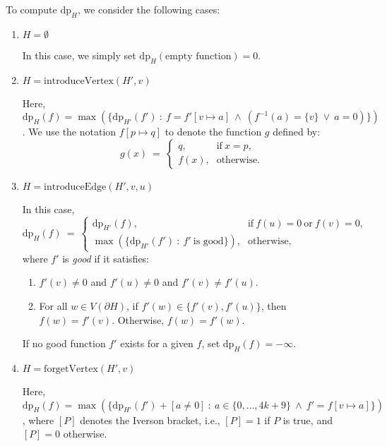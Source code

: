 \documentclass[12pt]{article}
\begin{document}
	To compute \(\text{dp}_{H}\), we consider the following cases:
	\begin{enumerate}
		\item \(H = \emptyset\)
		      
		      In this case, we simply set \(\text{dp}_{H}(\text{empty function})
		      = 0\).
		
		\item \(H = \text{introduceVertex}(H', v)\)
		      
		      Here, \(\text{dp}_{H}(f) = \max(\{\text{dp}_{H'}(f') \ : \ f =
		      f'[v \mapsto a] \ \wedge \ (f^{-1}(a) = \{v\} \ \vee \ a =
		      0)\})\). We use the notation \(f[p \mapsto q]\) to denote the
		      function \(g\) defined by:
		      \[ g(x) \ = \ \begin{cases} q \text{,} & \text{if} \ x = p
		      \text{,} \\
		      f(x) \text{,} & \text{otherwise.} \end{cases} \]
		
		\item \(H = \text{introduceEdge}(H', v, u)\)
		      
		      In this case,
		      \[ \text{dp}_{H}(f) \ = \ \begin{cases} \text{dp}_{H'}(f) \text{,}
		      & \text{if} \ f(u) = 0 \ \text{or} \ f(v) = 0 \text{,} \\
		      \max(\{\text{dp}_{H'}(f') \ : \ f' \ \text{is good}\}) \text{,} &
		      \text{otherwise,} \end{cases} \]
		      where \(f'\) is \textit{good} if it satisfies:
		      \begin{enumerate}[label=\theenumi.\arabic*]
		          \item \(f'(v) \neq 0\) and \(f'(u) \neq 0\) and \(f'(v) \neq
		                f'(u)\).
		          \item For all \(w \in V(\partial H)\), if \(f'(w) \in \{f'(v),
		                f'(u)\}\), then \(f(w) = f'(v)\). Otherwise, \(f(w) =
		                f'(w)\).
		      \end{enumerate}
		      
		      If no good function \(f'\) exists for a given \(f\), set
		      \(\text{dp}_{H}(f) = -\infty\).
		
		\item \(H = \text{forgetVertex}(H', v)\)
		      
		      Here, \(\text{dp}_{H}(f) = \max(\{\text{dp}_{H'}(f') + [a \neq 0]
		      \ : \ a \in \{0, \ldots, 4k + 9\} \ \wedge \ f' = f[v \mapsto
		      a]\})\), where \([P]\) denotes the Iverson bracket, i.e., \([P] =
		      1\) if \(P\) is true, and \([P] = 0\) otherwise.
		      

\end{enumerate}
\end{document}
